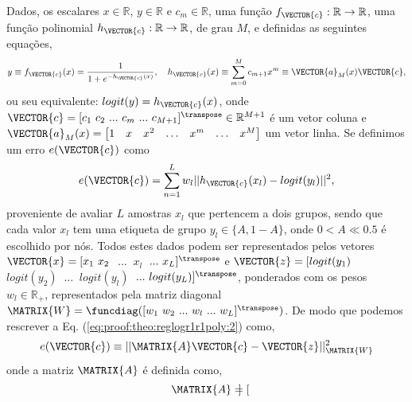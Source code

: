
\begin{myproofT}\label{proof:theo:reglogr1r1poly}
Dados,
os escalares $x \in \mathbb{R}$, $y \in \mathbb{R}$ e $c_m \in \mathbb{R}$,
uma função $f_{\VECTOR{c}}:\mathbb{R} \rightarrow \mathbb{R}$, 
uma função polinomial $h_{\VECTOR{c}}:\mathbb{R} \rightarrow \mathbb{R}$, de grau $M$, e 
definidas as seguintes equações,
\begin{equation}\label{eq:proof:theo:reglogr1r1poly:1}
y\equiv f_{\VECTOR{c}}(x)= \frac{1}{1+e^{-h_{\VECTOR{c}}(x) }},
\quad h_{\VECTOR{c}}(x)\equiv \sum_{m=0}^{M}c_{m+1} x^m\equiv \VECTOR{a}_M(x)\VECTOR{c},
\end{equation}
ou seu equivalente: $logit(y)=h_{\VECTOR{c}}(x)$,
onde $\VECTOR{c}=[c_1~ c_2~ ...~ c_m~ ...~ c_{M+1}]^{\transpose} \in \mathbb{R}^{M+1}$ é um vetor coluna e
$\VECTOR{a}_M(x)=\begin{bmatrix} 
1& x& x^2& \hdots & x^m& \hdots& x^M
\end{bmatrix}$ um vetor linha.
Se definimos um erro $e(\VECTOR{c})$ como
\begin{equation}\label{eq:proof:theo:reglogr1r1poly:2}
e(\VECTOR{c}) =  \sum_{n=1}^{L} w_l||h_{\VECTOR{c}}(x_l)-logit(y_l)||^2,
\end{equation}
proveniente de avaliar $L$ amostras $x_l$ que pertencem a dois grupos, 
sendo que cada valor $x_l$ tem uma etiqueta de grupo $y_l\in \{A,1-A\}$, 
onde $0<A\ll 0.5$ é escolhido por nós.
Todos estes dados podem ser representados pelos vetores 
$\VECTOR{x}=[x_1~ x_2~$ $...~$ $x_l~$ $...~ x_L]^{\transpose}$ 
e $\VECTOR{z}=[logit(y_1)~$ $logit(y_2)~$ $...~$ $logit(y_l)~$ $...~ logit(y_L)]^{\transpose}$,
ponderados com os pesos $w_l \in \mathbb{R}_+$, 
representados pela matriz diagonal $\MATRIX{W}=\funcdiag([w_1~ w_2~ ...~ w_l~ ...~ w_L]^{\transpose})$.
De modo que podemos rescrever a Eq. (\ref{eq:proof:theo:reglogr1r1poly:2}) como,
\begin{equation}\label{eq:proof:theo:reglogr1r1poly:3}
e(\VECTOR{c}) \equiv ||\MATRIX{A}\VECTOR{c}-\VECTOR{z}||_{\MATRIX{W}}^2 
\end{equation}
onde a matriz $\MATRIX{A}$ é definida como,
\begin{equation}\label{eq:proof:reglogr1r1poly:4}
\MATRIX{A}=\begin{bmatrix}

\end{bmatrix}
\end{equation}
\end{myproofT}
